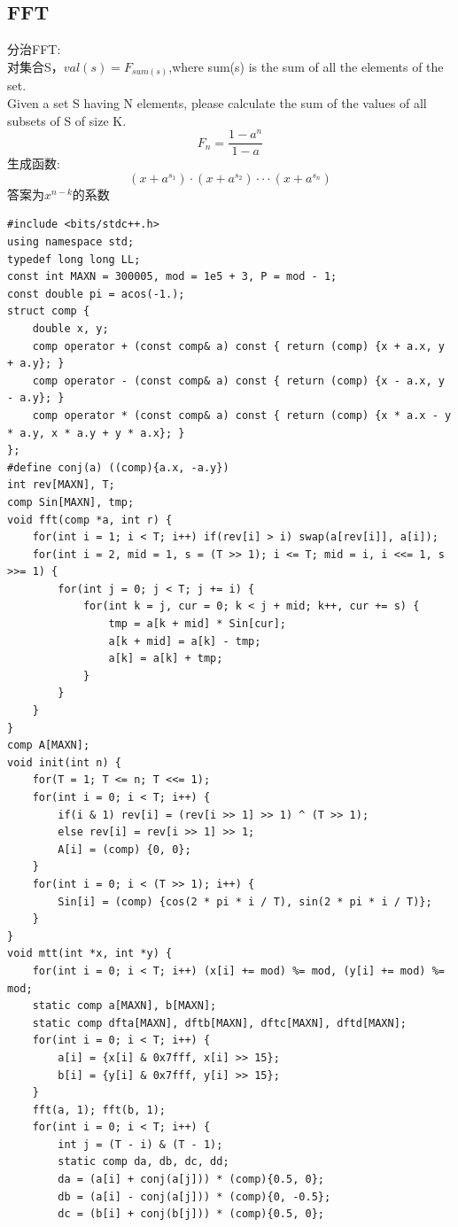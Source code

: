 \documentclass[10pt]{ctexart}
\begin{document}
{\subsection{FFT}
分治FFT:\\
对集合S，$val(s) = F_{sum(s)}$,where sum(s) is the sum of all the elements of the set.\\
Given a set S having N elements, please calculate the sum of the values of all subsets of S of size K.\\
$$
F_n = \frac{1 - a^n}{1-a}
$$
生成函数:
$$
(x+a^{s_1}) \cdot (x+a^{s_2}) \cdot \cdot \cdot (x+a^{s_n})
$$
答案为$x^{n-k}$的系数
\begin{lstlisting}
#include <bits/stdc++.h>
using namespace std;
typedef long long LL;
const int MAXN = 300005, mod = 1e5 + 3, P = mod - 1;
const double pi = acos(-1.);
struct comp {
    double x, y;
    comp operator + (const comp& a) const { return (comp) {x + a.x, y + a.y}; }
    comp operator - (const comp& a) const { return (comp) {x - a.x, y - a.y}; }
    comp operator * (const comp& a) const { return (comp) {x * a.x - y * a.y, x * a.y + y * a.x}; }
};
#define conj(a) ((comp){a.x, -a.y})
int rev[MAXN], T;
comp Sin[MAXN], tmp;
void fft(comp *a, int r) {
    for(int i = 1; i < T; i++) if(rev[i] > i) swap(a[rev[i]], a[i]);
    for(int i = 2, mid = 1, s = (T >> 1); i <= T; mid = i, i <<= 1, s >>= 1) {
        for(int j = 0; j < T; j += i) {
            for(int k = j, cur = 0; k < j + mid; k++, cur += s) {
                tmp = a[k + mid] * Sin[cur];
                a[k + mid] = a[k] - tmp;
                a[k] = a[k] + tmp;
            }
        }
    }
}
comp A[MAXN];
void init(int n) {
    for(T = 1; T <= n; T <<= 1);
    for(int i = 0; i < T; i++) {
        if(i & 1) rev[i] = (rev[i >> 1] >> 1) ^ (T >> 1);
        else rev[i] = rev[i >> 1] >> 1;
        A[i] = (comp) {0, 0};
    }
    for(int i = 0; i < (T >> 1); i++) {
        Sin[i] = (comp) {cos(2 * pi * i / T), sin(2 * pi * i / T)};
    }
}
void mtt(int *x, int *y) {
    for(int i = 0; i < T; i++) (x[i] += mod) %= mod, (y[i] += mod) %= mod;
    static comp a[MAXN], b[MAXN];
    static comp dfta[MAXN], dftb[MAXN], dftc[MAXN], dftd[MAXN];
    for(int i = 0; i < T; i++) {
        a[i] = {x[i] & 0x7fff, x[i] >> 15};
        b[i] = {y[i] & 0x7fff, y[i] >> 15};
    }
    fft(a, 1); fft(b, 1);
    for(int i = 0; i < T; i++) {
        int j = (T - i) & (T - 1);
        static comp da, db, dc, dd;
        da = (a[i] + conj(a[j])) * (comp){0.5, 0};
        db = (a[i] - conj(a[j])) * (comp){0, -0.5};
        dc = (b[i] + conj(b[j])) * (comp){0.5, 0};

\end{lstlisting}}
\end{document}
